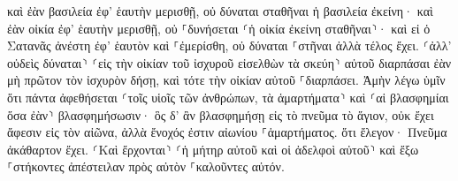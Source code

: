 \documentclass{openreader}
\begin{document}
καὶ ἐὰν βασιλεία ἐφ’ ἑαυτὴν μερισθῇ, οὐ δύναται σταθῆναι ἡ βασιλεία ἐκείνη· 
καὶ ἐὰν οἰκία ἐφ’ ἑαυτὴν μερισθῇ, οὐ ⸀δυνήσεται ⸂ἡ οἰκία ἐκείνη σταθῆναι⸃· 
καὶ εἰ ὁ Σατανᾶς ἀνέστη ἐφ’ ἑαυτὸν καὶ ⸀ἐμερίσθη, οὐ δύναται ⸀στῆναι ἀλλὰ τέλος ἔχει. 
⸂ἀλλ’ οὐδεὶς δύναται⸃ ⸂εἰς τὴν οἰκίαν τοῦ ἰσχυροῦ εἰσελθὼν τὰ σκεύη⸃ αὐτοῦ διαρπάσαι ἐὰν μὴ πρῶτον τὸν ἰσχυρὸν δήσῃ, καὶ τότε τὴν οἰκίαν αὐτοῦ ⸀διαρπάσει. 
Ἀμὴν λέγω ὑμῖν ὅτι πάντα ἀφεθήσεται ⸂τοῖς υἱοῖς τῶν ἀνθρώπων, τὰ ἁμαρτήματα⸃ καὶ ⸂αἱ βλασφημίαι ὅσα ἐὰν⸃ βλασφημήσωσιν· 
ὃς δ’ ἂν βλασφημήσῃ εἰς τὸ πνεῦμα τὸ ἅγιον, οὐκ ἔχει ἄφεσιν εἰς τὸν αἰῶνα, ἀλλὰ ἔνοχός ἐστιν αἰωνίου ⸀ἁμαρτήματος. 
ὅτι ἔλεγον· Πνεῦμα ἀκάθαρτον ἔχει. 
⸂Καὶ ἔρχονται⸃ ⸂ἡ μήτηρ αὐτοῦ καὶ οἱ ἀδελφοὶ αὐτοῦ⸃ καὶ ἔξω ⸀στήκοντες ἀπέστειλαν πρὸς αὐτὸν ⸀καλοῦντες αὐτόν. 
\end{document}
